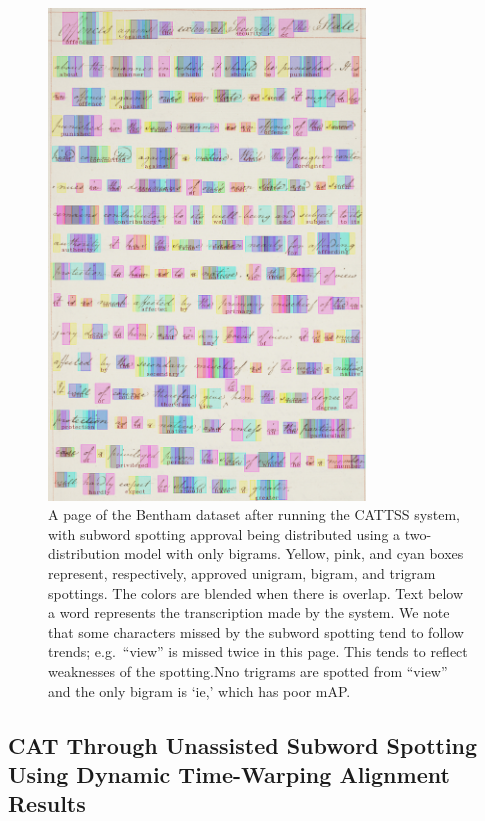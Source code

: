 \documentclass[ms,electronic,twosidetoc,letterpaper,chaptercenter,parttop,lof,lot]{byumsphd}
\begin{document}
\begin{figure}
    \centering
    \includegraphics[width=0.75\textwidth]{aftercattss}
    \caption{A page of the Bentham dataset after running the CATTSS system, with subword spotting approval being distributed using a two-distribution model with only bigrams. Yellow, pink, and cyan boxes represent, respectively, approved unigram, bigram, and trigram spottings. The colors are blended when there is overlap. Text below a word represents the transcription made by the system. We note that some characters missed by the subword spotting tend to follow trends; e.g.~``view'' is missed twice in this page. This tends to reflect weaknesses of the spotting.Nno trigrams are spotted from ``view'' and the only bigram is `ie,' which has poor mAP.}
    \label{fig:aftercattss}
\end{figure}




\subsection{CAT Through Unassisted Subword Spotting Using Dynamic Time-Warping Alignment Results}
\end{document}
